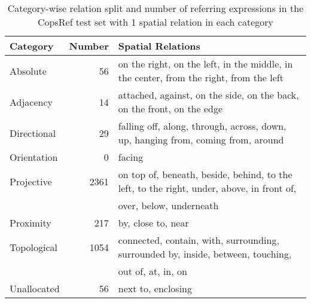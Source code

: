 \begin{table*}[!ht]
\centering
\begin{tabular}{lrl}
\toprule
Category & Number & Spatial Relations \\
\midrule
Absolute & 56 & on the right, on the left, in the middle, in the center, from the right, from the left\\
Adjacency & 14 & attached, against, on the side, on the back, on the front, on the edge \\
Directional & 29 & falling off, along, through, across, down, up, hanging from, coming from, around\\
Orientation & 0 & facing \\
Projective & 2361 & on top of, beneath, beside, behind, to the left, to the right, under, above, in front of,\\ & &  over, below, underneath \\ 
Proximity & 217 & by, close to, near \\ 
Topological & 1054 & connected, contain, with, surrounding, surrounded by, inside, between, touching,\\ & & out of, at, in, on \\
Unallocated & 56 & next to, enclosing \\
\bottomrule
\end{tabular}
\caption{Category-wise relation split and number of referring expressions in the CopsRef test set with 1 spatial relation in each category
}
\label{table: our work cat}
\end{table*}